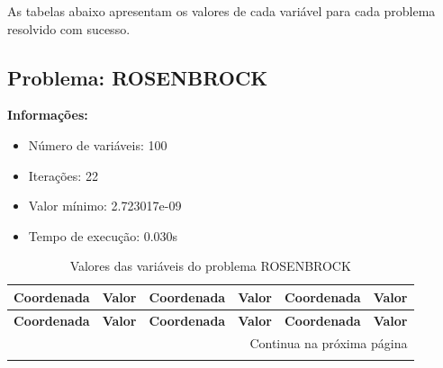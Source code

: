 \documentclass[12pt]{article}
\begin{document}
As tabelas abaixo apresentam os valores de cada variável para cada problema resolvido com sucesso.


\newpage            
\subsection{Problema: ROSENBROCK}

\textbf{Informações:}
\begin{itemize}
\item Número de variáveis: 100
\item Iterações: 22
\item Valor mínimo: 2.723017e-09
\item Tempo de execução: 0.030s
\end{itemize}

\small
\begin{longtable}{@{}cc|cc|cc@{}}
\caption{Valores das variáveis do problema ROSENBROCK} \\
\toprule
\textbf{Coordenada} & \textbf{Valor} & \textbf{Coordenada} & \textbf{Valor} & \textbf{Coordenada} & \textbf{Valor} \\
\midrule
\endfirsthead

\toprule
\textbf{Coordenada} & \textbf{Valor} & \textbf{Coordenada} & \textbf{Valor} & \textbf{Coordenada} & \textbf{Valor} \\
\midrule
\endhead

\midrule \multicolumn{6}{r}{{Continua na próxima página}} \\ \midrule
\endfoot


\end{longtable}
\end{document}
